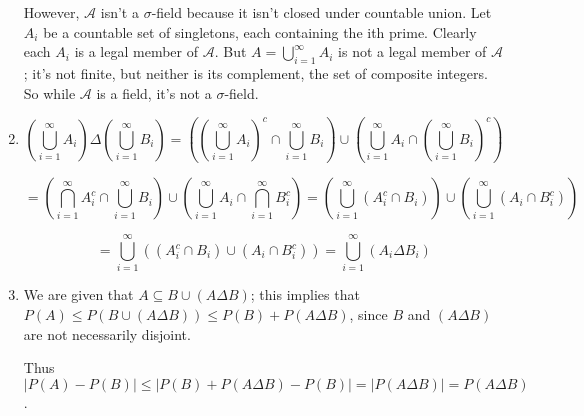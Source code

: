 \documentclass[12pt]{article}
\begin{document}
\begin{enumerate}
However, $\mathcal{A}$ isn't a $\sigma$-field because it isn't closed under countable union. Let $A_i$ be a countable set of singletons, each containing the ith prime. Clearly each $A_i$ is a legal member of $\mathcal{A}$. But $A=\bigcup_{i=1}^\infty A_i$ is not a legal member of $\mathcal{A}$; it's not finite, but neither is its complement, the set of composite integers. So while $\mathcal{A}$ is a field, it's not a $\sigma$-field. 

\item $$\left(\bigcup^\infty_{i=1} A_i \right) \Delta \left(\bigcup^\infty_{i=1} B_i \right)=\left( \left( \bigcup^\infty_{i=1} A_i \right)^c \cap \bigcup^\infty_{i=1} B_i \right) \cup \left( \bigcup^\infty_{i=1} A_i \cap \left( \bigcup^\infty_{i=1} B_i \right)^c \right)$$ 

$$=\left(  \bigcap^\infty_{i=1} A_i^c \cap \bigcup^\infty_{i=1} B_i \right) \cup \left( \bigcup^\infty_{i=1} A_i \cap  \bigcap^\infty_{i=1} B_i^c \right)=\left(  \bigcup^\infty_{i=1}( A_i^c \cap B_i )\right) \cup \left( \bigcup^\infty_{i=1} (A_i \cap  B_i^c) \right)$$ 

$$= \bigcup ^\infty_{i=1} \left(\left( A_i^c \cap B_i \right) \cup \left(  A_i \cap B_i^c \right) \right)= \bigcup^\infty_{i=1}(A_i \Delta B_i)$$

\item We are given that $A \subseteq B \cup (A \Delta B)$; this implies that $P(A) \leq P(B \cup (A \Delta B)) \leq P(B)+P(A \Delta B)$, since $B$ and $(A \Delta B)$ are not necessarily disjoint. 

Thus $|P(A)-P(B)|\leq |P(B)+P(A \Delta B)-P(B)|=|P(A \Delta B)|=P(A \Delta B)$.


\end{enumerate}
\end{document}

